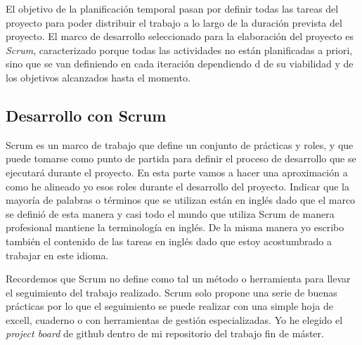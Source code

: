 El objetivo de la planificación temporal pasan por definir todas las tareas del proyecto para poder distribuir el trabajo a lo largo de la duración prevista del proyecto. El marco de desarrollo seleccionado para la elaboración del proyecto es \textit{Scrum}, caracterizado porque todas las actividades no están planificadas a priori, sino que se van definiendo en cada iteración dependiendo d de su viabilidad y de los objetivos alcanzados hasta el momento.

\subsection{Desarrollo con Scrum}

Scrum es un marco de trabajo que define un conjunto de prácticas y roles, y que puede tomarse como punto de partida para definir el proceso de desarrollo que se ejecutará durante el proyecto. En esta parte vamos a hacer una aproximación a como he alineado yo esos roles durante el desarrollo del proyecto. Indicar que la mayoría de palabras o términos que se utilizan están en inglés dado que el marco se definió de esta manera y casi todo el mundo que utiliza Scrum de manera profesional mantiene la terminología en inglés. De la misma manera yo escribo también el contenido de las tareas en inglés dado que estoy acostumbrado a trabajar en este idioma.

Recordemos que Scrum no define como tal un método o herramienta para llevar el seguimiento del trabajo realizado. Scrum solo propone una serie de buenas prácticas por lo que el seguimiento se puede realizar con una simple hoja de excell, cuaderno o con herramientas de gestión especializadas. Yo he elegido el \textit{project board} de github dentro de mi repositorio del trabajo fin de máster.

